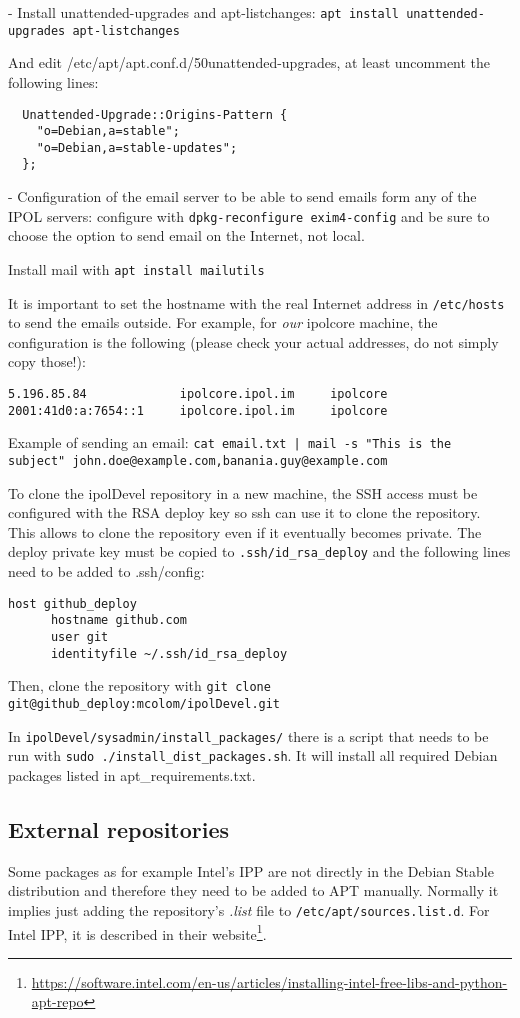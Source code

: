 \documentclass[a4paper,12pt]{article}
\begin{document}
- Install unattended-upgrades and apt-listchanges: {\tt apt install unattended-upgrades apt-listchanges}

And edit /etc/apt/apt.conf.d/50unattended-upgrades, at least uncomment the following lines:
\begin{verbatim}
  Unattended-Upgrade::Origins-Pattern {
    "o=Debian,a=stable";
    "o=Debian,a=stable-updates";
  };
\end{verbatim}

- Configuration of the email server to be able to send emails form any of the IPOL servers: configure with {\tt dpkg-reconfigure exim4-config} and be sure to choose the option to send email on the Internet, not local.

Install mail with {\tt apt install mailutils}

It is important to set the hostname with the real Internet address in {\tt /etc/hosts} to send the emails outside. For example, for \emph{our} ipolcore machine, the configuration is the following (please check your actual addresses, do not simply copy those!):

\begin{verbatim}
5.196.85.84             ipolcore.ipol.im     ipolcore
2001:41d0:a:7654::1     ipolcore.ipol.im     ipolcore
\end{verbatim}

Example of sending an email: {\tt cat email.txt | mail -s "This is the subject" john.doe@example.com,banania.guy@example.com}

To clone the ipolDevel repository in a new machine, the SSH access must be configured with the RSA deploy key so ssh can use it to clone the repository. This allows to clone the repository even if it eventually becomes private.
%
The deploy private key must be copied to {\tt .ssh/id\_rsa\_deploy} and the following lines need to be added to .ssh/config:

\begin{verbatim}
host github_deploy
      hostname github.com
      user git
      identityfile ~/.ssh/id_rsa_deploy
\end{verbatim}

Then, clone the repository with {\tt git clone git@github\_deploy:mcolom/ipolDevel.git}

In {\tt ipolDevel/sysadmin/install\_packages/} there is a script that needs to be run with {\tt sudo ./install\_dist\_packages.sh}. It will install all required Debian packages listed in apt\_requirements.txt.

\subsection{External repositories}
Some packages as for example Intel's IPP are not directly in the Debian Stable distribution and therefore they need to be added to APT manually. Normally it implies just adding the repository's \emph{.list} file to {\tt /etc/apt/sources.list.d}.
For Intel IPP, it is described in their website\footnote{\url{https://software.intel.com/en-us/articles/installing-intel-free-libs-and-python-apt-repo}}.
\end{document}
